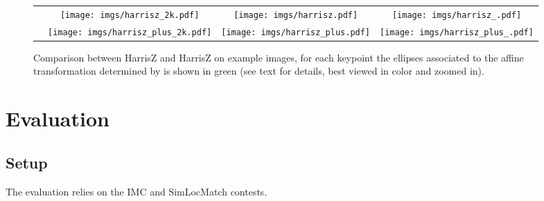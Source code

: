 \documentclass[times,twocolumn,final,authoryear]{elsarticle}
\begin{document}
\begin{figure}[ht]
	\center
	\begin{tabular}[c]{@{}c@{\hskip 0.2em}c@{\hskip 0.2em}c@{\hskip 0.2em}c@{\hskip 0.2em}}
		\rotatebox[origin=l]{90}{\hspace{1em}HarrisZ} & \texttt{[image: imgs/harrisz\_2k.pdf]} & \texttt{[image: imgs/harrisz.pdf]} & \texttt{[image: imgs/harrisz\_.pdf]}\\
		\rotatebox[origin=l]{90}{\hspace{1em}HarrisZ} & \texttt{[image: imgs/harrisz\_plus\_2k.pdf]} & \texttt{[image: imgs/harrisz\_plus.pdf]} & \texttt{[image: imgs/harrisz\_plus\_.pdf]}\\
	\end{tabular}
	\caption{\label{hz_hzplus}
		Comparison between HarrisZ and HarrisZ on example images, for each keypoint the ellipses associated to the affine transformation determined by  is shown in green (see text for details, best viewed in color and zoomed in).}
\end{figure}

\vspace{-2em}
\section{Evaluation}\label{evaluation}
\vspace{-0.5em}
\subsection{Setup}
The evaluation relies on the IMC and SimLocMatch contests.
\end{document}
